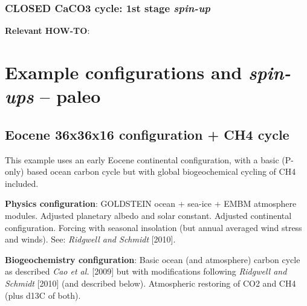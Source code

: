 \documentclass[10pt,twoside]{article}
\begin{document}

\subsubsection{CLOSED CaCO3 cycle: 1st stage \textit{spin-up}}\label{EXAMPLE.worjh2.Archeretal2009.SPIN2}

\noindent \textbf{Relevant HOW-TO}: 


\newpage
\section{Example configurations and \textit{spin-ups} -- paleo}\label{example_spinups_paleo}


\subsection{Eocene 36x36x16 configuration + CH4 cycle}\label{EXAMPLE.p0055c.PO4CH4.SPIN}

This example uses an early Eocene continental configuration, with a basic (P-only) based ocean carbon cycle but with global biogeochemical cycling of CH4 included.

\noindent \textbf{Physics configuration}: GOLDSTEIN ocean + sea-ice + EMBM atmosphere modules. Adjusted planetary albedo and solar constant. Adjusted continental configuration. Forcing with seasonal insolation (but annual averaged wind stress and winds). See: \textit{Ridgwell and Schmidt} [2010].

\noindent \textbf{Biogeochemistry configuration}: Basic ocean (and atmosphere) carbon cycle as described \textit{Cao et al.} [2009] but with modifications following \textit{Ridgwell and Schmidt} [2010] (and described below). Atmospheric restoring of CO2 and CH4 (plus d13C of both).
\end{document}

